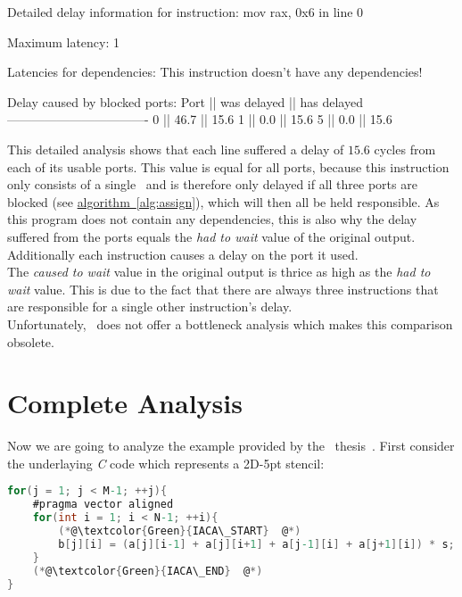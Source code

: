 \begin{example}
Detailed delay information for instruction: mov rax, 0x6 in line 0
    
            Maximum latency: 1
            
            Latencies for dependencies:
            This instruction doesn't have any dependencies!
                      
            Delay caused by blocked ports:
             Port || was delayed || has delayed
             ----------------------------------
              0   ||    46.7     ||    15.6
              1   ||     0.0     ||    15.6
              5   ||     0.0     ||    15.6
\end{example}

This detailed analysis shows that each line suffered a delay of $15.6$ cycles from each of its usable ports. This value is equal for all ports, because this instruction only consists of a single \microop\ and is therefore only delayed if all three ports are blocked (see \hyperref[alg:assign]{algorithm~\ref*{alg:assign}}), which will then all be held responsible. As this program does not contain any dependencies, this is also why the delay suffered from the ports equals the \emph{had to wait} value of the original output. Additionally each instruction causes a delay on the port it used.\\
The \emph{caused to wait} value in the original output is thrice as high as the \emph{had to wait} value. This is due to the fact that there are always three instructions that are responsible for a single other instruction's delay.\\

Unfortunately, \osaca\ does not offer a bottleneck analysis which makes this comparison obsolete.


\section{Complete Analysis}

Now we are going to analyze the example provided by the \osaca\ thesis~\cite{osaca-thesis}. First consider the underlaying \emph{C} code which represents a 2D-5pt stencil:


\begin{mdframed}[backgroundcolor=light-gray, roundcorner=10pt,leftmargin=1, rightmargin=1, innerleftmargin=15, innertopmargin=1,innerbottommargin=1, outerlinewidth=1, linecolor=light-gray]
    \begin{lstlisting}[language=C, basicstyle=\scriptsize]
for(j = 1; j < M-1; ++j){
    #pragma vector aligned
    for(int i = 1; i < N-1; ++i){
        (*@\textcolor{Green}{IACA\_START}  @*)
        b[j][i] = (a[j][i-1] + a[j][i+1] + a[j-1][i] + a[j+1][i]) * s;
    }
    (*@\textcolor{Green}{IACA\_END}  @*)
}
    \end{lstlisting}
\end{mdframed}

